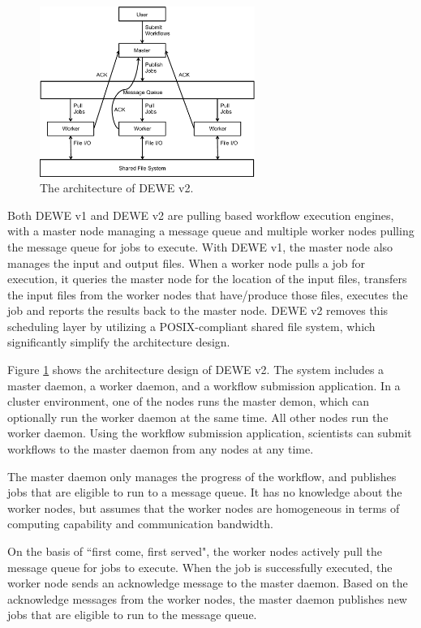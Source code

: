 \begin{figure}[!t]
	\centering
	\hspace{-5pt}
	\includegraphics[width=7cm]{dewe_v2_architecture}
    \vspace{5pt}
	\caption{The architecture of DEWE v2.}
	\label{fig:dewe_v2_architecture}
\end{figure}


Both DEWE v1 and DEWE v2 are pulling based workflow execution engines, with a master node managing a message queue and multiple worker nodes pulling the message queue for jobs to execute. With DEWE v1, the master node also manages the input and output files. When a worker node pulls a job for execution, it queries the master node for the location of the input files, transfers the input files from the worker nodes that have/produce those files, executes the job and reports the results back to the master node. DEWE v2 removes this scheduling layer by utilizing a POSIX-compliant shared file system, which significantly simplify the architecture design. 



Figure \ref{fig:dewe_v2_architecture} shows the architecture design of DEWE v2. The system includes a master daemon, a worker daemon, and a workflow submission application. In a cluster environment, one of the nodes runs the master demon, which can optionally run the worker daemon at the same time. All other nodes run the worker daemon. Using the workflow submission application, scientists can submit workflows to the master daemon from any nodes at any time. 

The master daemon only manages the progress of the workflow, and publishes jobs that are eligible to run to a message queue. It has no knowledge about the worker nodes, but assumes that the worker nodes are homogeneous in terms of computing capability and communication bandwidth. 

On the basis of ``first come, first served", the worker nodes actively pull the message queue for jobs to execute. When the job is successfully executed, the worker node sends an acknowledge message to the master daemon. Based on the acknowledge messages from the worker nodes, the master daemon publishes new jobs that are eligible to run to the message queue.

